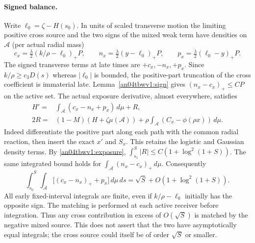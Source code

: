 \documentclass[11pt]{article}
\newcommand{\dd}{\,d}\newcommand{\E}{\mathbb E}
\begin{document}
\paragraph{Signed balance.}
Write $\ell_0=\zeta-H(s_0)$. In units of scaled transverse motion
the limiting positive cross source and the two signs of the mixed
weak term have densities on $\mathcal A$ (per actual radial mass)
\[
 c_x=\tfrac{\lambda}{2}(k/\rho-\ell_0)_+P,\qquad
 n_x=\tfrac{\lambda}{2}(y-\ell_0)_+P,\qquad
 p_x=\tfrac{\lambda}{2}(\ell_0-y)_+P .
\]
The signed transverse terms at late times are $+c_x,-n_x,+p_x$.
Since $k/\rho\ge c_3D(s)$ whereas $|\ell_0|$ is bounded,
the positive-part truncation of the cross coefficient is immaterial
late. Lemma~\ref{an04tbwv1:sign} gives $(n_x-c_x)_+\le C P$
on the active set. The actual exposure derivative, almost everywhere,
satisfies
\begin{align}
 H'={}&\int_{\mathcal A}(c_x-n_x+p_x)\dd\mu+R,\nonumber\\
 2R={}&(1-M)(H+\zeta\mu(\mathcal A))
              +\rho\int_{\mathcal A}(C_x-\phi(\rho x))\dd\mu .
 \label{an04tbwv1:balance}
\end{align}
Indeed differentiate the positive part along each path with the
common radial reaction, then insert the exact $x'$ and $S_x$.
This retains the logistic and Gaussian density terms.
By \eqref{an04tbwv1:exposure}, $\int_{s_1}^S |R|\le C(1+\log^2(1+S))$.
The same integrated bound holds for $\int_{\mathcal A}(n_x-c_x)_+\dd\mu$.
Consequently
\begin{equation}\label{an04tbwv1:matched}
 \int_{s_0}^S\int_{\mathcal A}\big[(c_x-n_x)_++p_x\big]\dd\mu\,ds
       =\sqrt S+O(1+\log^2(1+S)).
\end{equation}
All early fixed-interval integrals are finite, even if
$k/\rho-\ell_0$ initially has the opposite sign.
The matching is performed at each active receiver before
integration. Thus any cross contribution in excess of $O(\sqrt S)$
is matched by the negative mixed source. This does not assert that
the two have asymptotically equal integrals; the cross source
could itself be of order $\sqrt S$ or smaller.
\end{document}

